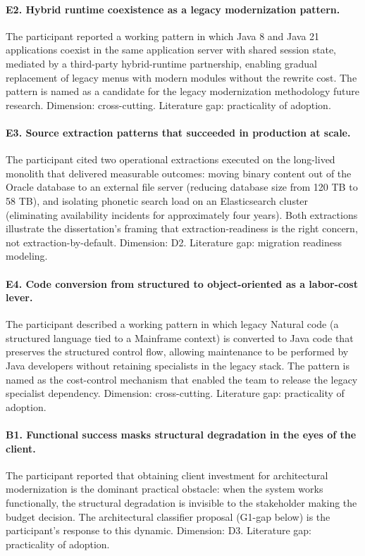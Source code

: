 \paragraph*{E2. Hybrid runtime coexistence as a legacy modernization pattern.} The participant reported a working pattern in which Java 8 and Java 21 applications coexist in the same application server with shared session state, mediated by a third-party hybrid-runtime partnership, enabling gradual replacement of legacy menus with modern modules without the rewrite cost. The pattern is named as a candidate for the legacy modernization methodology future research. Dimension: cross-cutting. Literature gap: practicality of adoption.

\paragraph*{E3. Source extraction patterns that succeeded in production at scale.} The participant cited two operational extractions executed on the long-lived monolith that delivered measurable outcomes: moving binary content out of the Oracle database to an external file server (reducing database size from 120 TB to 58 TB), and isolating phonetic search load on an Elasticsearch cluster (eliminating availability incidents for approximately four years). Both extractions illustrate the dissertation's framing that extraction-readiness is the right concern, not extraction-by-default. Dimension: D2. Literature gap: migration readiness modeling.

\paragraph*{E4. Code conversion from structured to object-oriented as a labor-cost lever.} The participant described a working pattern in which legacy Natural code (a structured language tied to a Mainframe context) is converted to Java code that preserves the structured control flow, allowing maintenance to be performed by Java developers without retaining specialists in the legacy stack. The pattern is named as the cost-control mechanism that enabled the team to release the legacy specialist dependency. Dimension: cross-cutting. Literature gap: practicality of adoption.

\paragraph*{B1. Functional success masks structural degradation in the eyes of the client.} The participant reported that obtaining client investment for architectural modernization is the dominant practical obstacle: when the system works functionally, the structural degradation is invisible to the stakeholder making the budget decision. The architectural classifier proposal (G1-gap below) is the participant's response to this dynamic. Dimension: D3. Literature gap: practicality of adoption.

